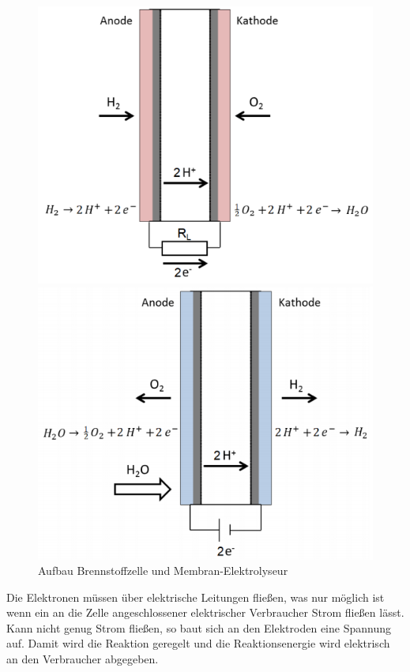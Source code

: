 \documentclass[a4paper,12pt,bibtotocnumbered]{scrartcl}
\numberwithin{equation}{section} %
\begin{document}
\begin{figure}[h]
\begin{minipage}[b]{0.5\linewidth}
\centering
\includegraphics[width=.9\textwidth]{BZelle.png}
\end{minipage}
\begin{minipage}[b]{0.5\linewidth}
\centering
\includegraphics[width=.9\textwidth]{Elysour.png}
\end{minipage}
\caption{Aufbau Brennstoffzelle und Membran-Elektrolyseur \cite{Anleitung}}
\end{figure}
Die Elektronen müssen über elektrische Leitungen fließen, was nur möglich ist wenn ein an die Zelle angeschlossener elektrischer Verbraucher Strom fließen lässt. Kann nicht genug Strom fließen, so baut sich an den Elektroden eine Spannung auf. Damit wird die Reaktion geregelt und die Reaktionsenergie wird elektrisch an den Verbraucher abgegeben.\\
\end{document}
